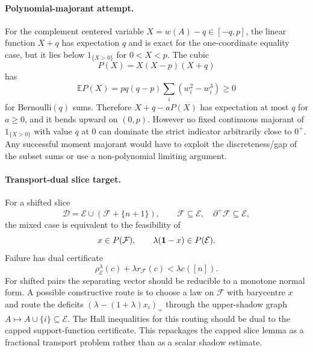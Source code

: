 \documentclass[12pt]{article}
\begin{document}
\paragraph{Polynomial-majorant attempt.}
For the complement centered variable \(X=w(A)-q\in[-q,p]\), the linear function
\(X+q\) has expectation \(q\) and is exact for the one-coordinate equality case,
but it lies below \(1_{\{X>0\}}\) for \(0<X<p\).  The cubic
\[
   P(X)=X(X-p)(X+q)
\]
has
\[
   \mathbb E P(X)=pq(q-p)\sum_i(w_i^2-w_i^3)\ge0
\]
for Bernoulli\((q)\) sums.  Therefore \(X+q-aP(X)\) has expectation at most
\(q\) for \(a\ge0\), and it bends upward on \((0,p)\).  However no fixed
continuous majorant of \(1_{\{X>0\}}\) with value \(q\) at \(0\) can dominate
the strict indicator arbitrarily close to \(0^+\).  Any successful moment
majorant would have to exploit the discreteness/gap of the subset sums or use a
non-polynomial limiting argument.

\paragraph{Transport-dual slice target.}
For a shifted slice
\[
  \mathcal D=\mathcal E\cup(\mathcal F+\{n+1\}),\qquad
  \mathcal F\subseteq\mathcal E,\quad \partial^+\mathcal F\subseteq\mathcal E,
\]
the mixed case is equivalent to the feasibility of
\[
  x\in P(\mathcal F),\qquad \lambda({\bf1}-x)\in P(\mathcal E).
\]
Failure has dual certificate
\[
   \rho^\lambda_{\mathcal E}(c)+\lambda r_{\mathcal F}(c)<\lambda c([n]).
\]
For shifted pairs the separating vector should be reducible to a monotone
normal form.  A possible constructive route is to choose a law on
\(\mathcal F\) with barycentre \(x\) and route the deficits
\((\lambda-(1+\lambda)x_i)_+\) through the upper-shadow graph
\(A\mapsto A\cup\{i\}\subseteq\mathcal E\).  The Hall inequalities for this
routing should be dual to the capped support-function certificate.  This
repackages the capped slice lemma as a fractional transport problem rather than
as a scalar shadow estimate.
\end{document}
